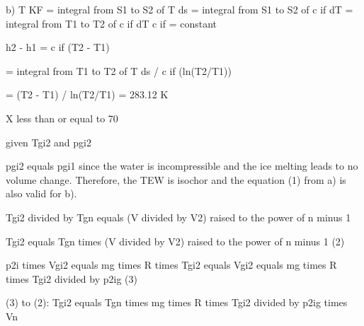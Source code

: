 b) T KF = integral from S1 to S2 of T ds = integral from S1 to S2 of c if dT = integral from T1 to T2 of c if dT
c if = constant

h2 - h1 = c if (T2 - T1)

= integral from T1 to T2 of T ds / c if (ln(T2/T1))

= (T2 - T1) / ln(T2/T1) = 283.12 K

X less than or equal to 70

given Tgi2 and pgi2

pgi2 equals pgi1 since the water is incompressible and the ice melting leads to no volume change. Therefore, the TEW is isochor and the equation (1) from a) is also valid for b).

Tgi2 divided by Tgn equals (V divided by V2) raised to the power of n minus 1

Tgi2 equals Tgn times (V divided by V2) raised to the power of n minus 1 (2)

p2i times Vgi2 equals mg times R times Tgi2 equals Vgi2 equals mg times R times Tgi2 divided by p2ig (3)

(3) to (2): Tgi2 equals Tgn times mg times R times Tgi2 divided by p2ig times Vn
